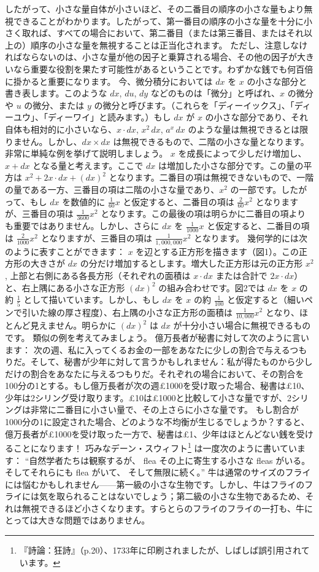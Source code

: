 \documentclass[a4paper,11pt,openany]{ltjsbook}
\begin{document}
したがって、小さな量自体が小さいほど、その二番目の順序の小さな量もより無視できることがわかります。したがって、第一番目の順序の小さな量を十分に小さく取れば、すべての場合において、第二番目（または第三番目、またはそれ以上の）順序の小さな量を無視することは正当化されます。
ただし、注意しなければならないのは、小さな量が他の因子と乗算される場合、その他の因子が大きいなら重要な役割を果たす可能性があるということです。わずかな銭でも何百倍に掛かると重要になります。
今、微分積分においては $dx$ を $x$ の小さな部分と書き表します。このような $dx$, $du$, $dy$ などのものは「微分」と呼ばれ、$x$ の微分や $u$ の微分、または $y$ の微分と呼びます。（これらを「ディーイックス」、「ディーユウ」、「ディーワイ」と読みます。）もし $dx$ が $x$ の小さな部分であり、それ自体も相対的に小さいなら、$x \cdot dx$, $x^2 \, dx$, $a^x \, dx$ のような量は無視できるとは限りません。しかし、$dx \times dx$ は無視できるもので、二階の小さな量となります。
非常に単純な例を挙げて説明しましょう。
$x$ を成長によって少しだけ増加し、$x + dx$ となる量と考えます。ここで $dx$ は増加した小さな部分です。この量の平方は $x^2 + 2x \cdot dx + (dx)^2$ となります。二番目の項は無視できないもので、一階の量である一方、三番目の項は二階の小さな量であり、$x^2$ の一部です。したがって、もし $dx$ を数値的に $\frac{1}{60} x$ と仮定すると、二番目の項は $\frac{2}{60} x^2$ となりますが、三番目の項は $\frac{1}{3600} x^2$ となります。この最後の項は明らかに二番目の項よりも重要ではありません。しかし、さらに $dx$ を $\frac{1}{1000} x$ と仮定すると、二番目の項は $\frac{2}{1000} x^2$ となりますが、三番目の項は $\frac{1}{1,000,000} x^2$ となります。
幾何学的には次のように表すことができます：
$x$ を辺とする正方形を描きます（図1）。この正方形の大きさが $dx$ の分だけ増加するとします。増大した正方形は元の正方形 $x^2$, 上部と右側にある各長方形（それぞれの面積は $x \cdot dx$ または合計で $2x \cdot dx$）と、右上隅にある小さな正方形 $(dx)^2$ の組み合わせです。図2では $dx$ を $x$ の約 $\frac{1}{5}$ として描いています。しかし、もし $dx$ を $x$ の約 $\frac{1}{100}$ と仮定すると（細いペンで引いた線の厚さ程度）、右上隅の小さな正方形の面積は $\frac{1}{10,000} x^2$ となり、ほとんど見えません。明らかに $(dx)^2$ は $dx$ が十分小さい場合に無視できるものです。
類似の例を考えてみましょう。
億万長者が秘書に対して次のように言います：
次の週、私に入ってくるお金の一部をあなたに少しの割合で与えるつもりだ。そして、秘書が少年に対して言うかもしれません：私が得たものから少しだけの割合をあなたに与えるつもりだ。それぞれの場合において、その割合を100分の1とする。もし億万長者が次の週£1000を受け取った場合、秘書は£10、少年は2シリング受け取ります。£10は£1000と比較して小さな量ですが、2シリングは非常に二番目に小さい量で、その上さらに小さな量です。
もし割合が1000分の1に設定された場合、どのような不均衡が生じるでしょうか？すると、億万長者が£1000を受け取った一方で、秘書は£1、少年はほとんどない銭を受けることになります！
巧みなデーン・スウィフト\footnote{『詩論：狂詩』（p.20）、1733年に印刷されましたが、しばしば誤引用されています。}
は一度次のように書いています：
``自然学者たちは観察するが、 flea
その上に寄生する小さな fleas がいる。
そしてそれらにも flea がいて、
そして無限に続く。''
牛は通常のサイズのフライには悩むかもしれません——第一級の小さな生物です。しかし、牛はフライのフライには気を取られることはないでしょう；第二級の小さな生物であるため、それは無視できるほど小さくなります。すらとらのフライのフライの一打も、牛にとっては大きな問題ではありません。
\end{document}
